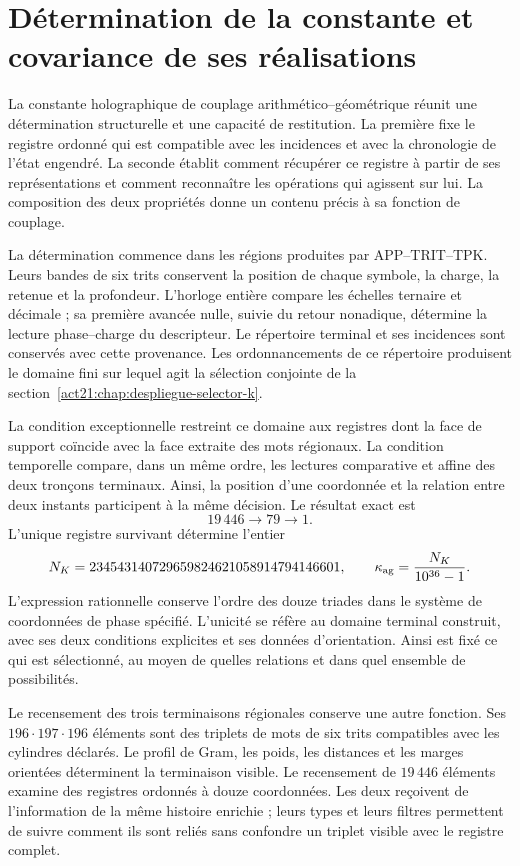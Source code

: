\section{Détermination de la constante et covariance de ses réalisations}
\label{act21:centralidad-constante}

La constante holographique de couplage arithmético--géométrique réunit une
détermination structurelle et une capacité de restitution. La première fixe
le registre ordonné qui est compatible avec les incidences et avec la
chronologie de l’état engendré. La seconde établit comment récupérer ce
registre à partir de ses représentations et comment reconnaître les opérations qui
agissent sur lui. La composition des deux propriétés donne un contenu précis
à sa fonction de couplage.

La détermination commence dans les régions produites par APP--TRIT--TPK. Leurs bandes de six trits conservent la position de chaque symbole, la charge, la retenue et la profondeur. L'horloge entière compare les échelles ternaire et décimale ; sa première avancée nulle, suivie du retour nonadique, détermine la lecture phase--charge du descripteur. Le répertoire terminal et ses incidences sont conservés avec cette provenance. Les ordonnancements de ce répertoire produisent le domaine fini sur lequel agit la sélection conjointe de la section~\ref{act21:chap:despliegue-selector-k}.

La condition exceptionnelle restreint ce domaine aux registres dont la face
de support coïncide avec la face extraite des mots régionaux. La
condition temporelle compare, dans un même ordre, les lectures
comparative et affine des deux tronçons terminaux. Ainsi, la position
d’une coordonnée et la relation entre deux instants participent à la même
décision. Le résultat exact est
\[
 19\,446\longrightarrow79\longrightarrow1.
\]
L’unique registre survivant détermine l’entier
\[
 N_K=234543140729659824621058914794146601,
 \qquad
 \kappa_{\rm ag}=\frac{N_K}{10^{36}-1}.
\]
L’expression rationnelle conserve l’ordre des douze triades dans le système de coordonnées
de phase spécifié. L’unicité se réfère au domaine terminal
construit, avec ses deux conditions explicites et ses données d’orientation.
Ainsi est fixé ce qui est sélectionné, au moyen de quelles relations et dans
quel ensemble de possibilités.

Le recensement des trois terminaisons régionales conserve une autre fonction.
Ses \(196\cdot197\cdot196\) éléments sont des triplets de mots de six
trits compatibles avec les cylindres déclarés. Le profil de Gram, les
poids, les distances et les marges orientées déterminent la terminaison
visible. Le recensement de \(19\,446\) éléments examine des registres ordonnés à
douze coordonnées. Les deux reçoivent de l’information de la même histoire
enrichie ; leurs types et leurs filtres permettent de suivre comment ils sont reliés
sans confondre un triplet visible avec le registre complet.

